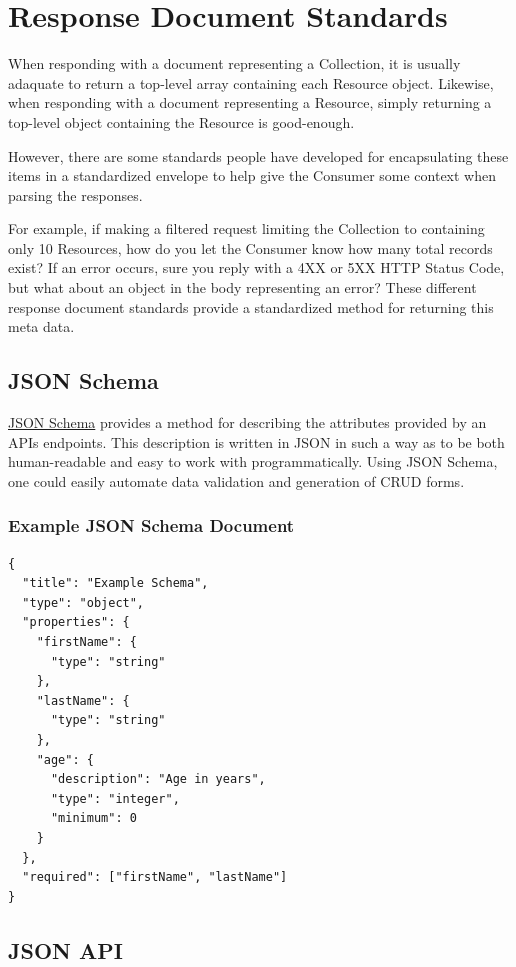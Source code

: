 \documentclass{book}
\begin{document}
\section{Response Document Standards}

When responding with a document representing a Collection, it is usually adaquate to return a top-level array containing each Resource object. Likewise, when responding with a document representing a Resource, simply returning a top-level object containing the Resource is good-enough.

However, there are some standards people have developed for encapsulating these items in a standardized envelope to help give the Consumer some context when parsing the responses.

For example, if making a filtered request limiting the Collection to containing only 10 Resources, how do you let the Consumer know how many total records exist? If an error occurs, sure you reply with a 4XX or 5XX HTTP Status Code, but what about an object in the body representing an error? These different response document standards provide a standardized method for returning this meta data.

\subsection{JSON Schema}

\href{http://json-schema.org/}{JSON Schema} provides a method for describing the attributes provided by an APIs endpoints. This description is written in JSON in such a way as to be both human-readable and easy to work with programmatically. Using JSON Schema, one could easily automate data validation and generation of CRUD forms.

\subsubsection{Example JSON Schema Document}

\begin{verbatim}
{
  "title": "Example Schema",
  "type": "object",
  "properties": {
    "firstName": {
      "type": "string"
    },
    "lastName": {
      "type": "string"
    },
    "age": {
      "description": "Age in years",
      "type": "integer",
      "minimum": 0
    }
  },
  "required": ["firstName", "lastName"]
}
\end{verbatim}

\subsection{JSON API}
\end{document}
